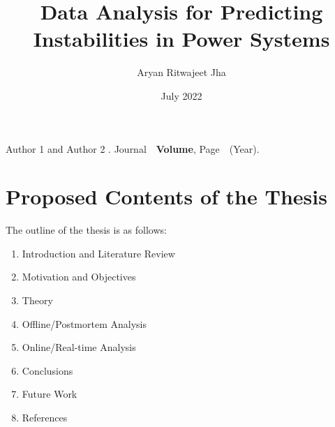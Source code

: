 \documentclass[MS,synopsis]{iitddiss}
\title{Data Analysis for Predicting Instabilities in Power Systems}
\author{Aryan Ritwajeet Jha}
\date{July 2022}
\begin{document}
\maketitle



\setcounter{page}{0}

















\begin{singlespace}
\begin{thebibliography}{10}

Author 1 and Author 2
.
\newblock Journal\ \ {\bf Volume}, Page\ \ (Year).
\end{thebibliography}

\end{singlespace}

\section{Proposed Contents of the Thesis}
The outline of the thesis is as follows:
\begin{enumerate}
\item Introduction and Literature Review
\item Motivation and Objectives
\item Theory
\item Offline/Postmortem Analysis
\item Online/Real-time Analysis
\item Conclusions
\item Future Work
\item References
\end{enumerate}
\end{document}

